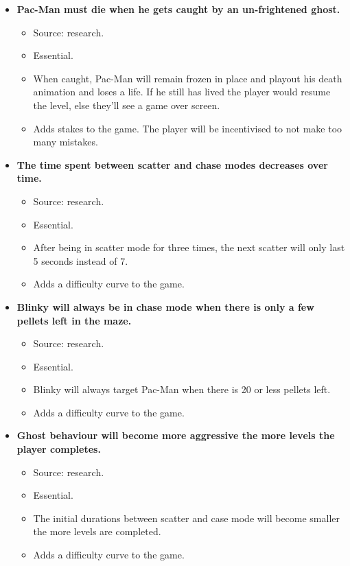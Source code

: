 \documentclass[letterpaper, 11pt]{article}
\begin{document}
\begin{itemize}
\item \textbf{Pac-Man must die when he gets caught by an un-frightened ghost.}
\begin{itemize}
\item Source: research.
\item Essential.
\item When caught, Pac-Man will remain frozen in place and playout his death animation and loses a life.
If he still has lived the player would resume the level, else they’ll see a game over screen.
\item Adds stakes to the game.
The player will be incentivised to not make too many mistakes.
\end{itemize}
\end{itemize}


\begin{itemize}
\item \textbf{The time spent between scatter and chase modes decreases over time.}
\begin{itemize}
\item Source: research.
\item Essential.
\item After being in scatter mode for three times, the next scatter will only last 5 seconds instead of 7.
\item Adds a difficulty curve to the game.
\end{itemize}
\end{itemize}


\begin{itemize}
\item \textbf{Blinky will always be in chase mode when there is only a few pellets left in the maze.}
\begin{itemize}
\item Source: research.
\item Essential.
\item Blinky will always target Pac-Man when there is 20 or less pellets left.
\item Adds a difficulty curve to the game.
\end{itemize}
\end{itemize}


\begin{itemize}
\item \textbf{Ghost behaviour will become more aggressive the more levels the player completes.}
\begin{itemize}
\item Source: research.
\item Essential.
\item The initial durations between scatter and case mode will become smaller the more levels are completed.
\item Adds a difficulty curve to the game.
\end{itemize}
\end{itemize}
\end{document}
